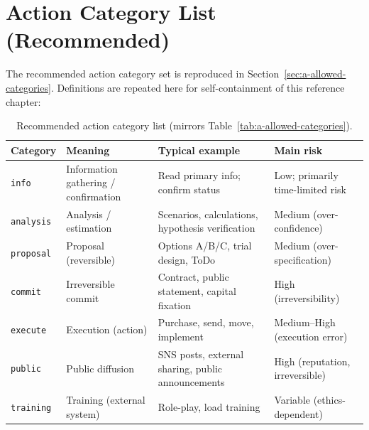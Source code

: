 \section{Action Category List (Recommended)}
\label{sec:a-allowed-dict-categories}

The recommended action category set is reproduced in
Section~\ref{sec:a-allowed-categories}. Definitions are repeated here
for self-containment of this reference chapter:

\begin{table}[ht]
\centering
\small
\begin{tabularx}{\linewidth}{lXXX}
\toprule
\textbf{Category} & \textbf{Meaning} & \textbf{Typical example} & \textbf{Main risk} \\
\midrule

\texttt{info} & Information gathering / confirmation
& Read primary info; confirm status
& Low; primarily time-limited risk \\

\texttt{analysis} & Analysis / estimation
& Scenarios, calculations, hypothesis verification
& Medium (over-confidence) \\

\texttt{proposal} & Proposal (reversible)
& Options A/B/C, trial design, ToDo
& Medium (over-specification) \\

\texttt{commit} & Irreversible commit
& Contract, public statement, capital fixation
& High (irreversibility) \\

\texttt{execute} & Execution (action)
& Purchase, send, move, implement
& Medium--High (execution error) \\

\texttt{public} & Public diffusion
& SNS posts, external sharing, public announcements
& High (reputation, irreversible) \\

\texttt{training} & Training (external system)
& Role-play, load training
& Variable (ethics-dependent) \\

\bottomrule
\end{tabularx}
\caption[Action category recommended list]{Recommended action
category list (mirrors Table~\ref{tab:a-allowed-categories}).}
\label{tab:a-allowed-dict-categories}
\end{table}

